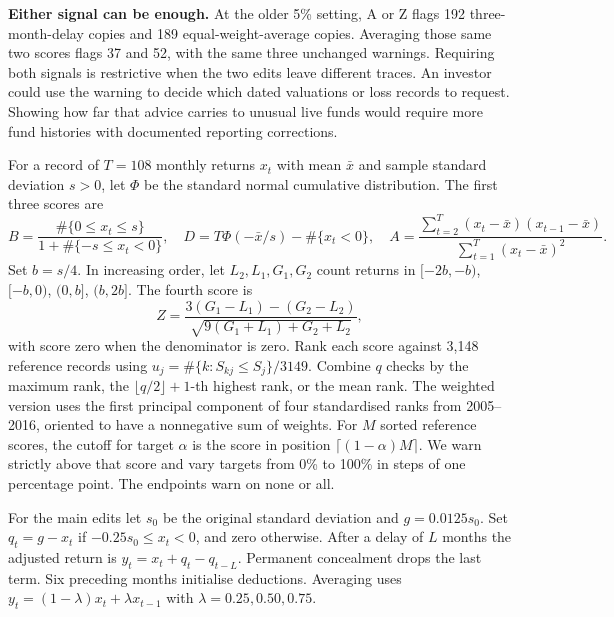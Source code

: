 \documentclass[11pt,letterpaper]{article}
\newcommand{\subhead}[1]{\vspace{3pt}{\large\bfseries #1}\par}
\begin{document}
\textbf{Either signal can be enough.} At the older 5\% setting, A or Z flags 192 three-month-delay copies and 189 equal-weight-average copies. Averaging those same two scores flags 37 and 52, with the same three unchanged warnings. Requiring both signals is restrictive when the two edits leave different traces. An investor could use the warning to decide which dated valuations or loss records to request. Showing how far that advice carries to unusual live funds would require more fund histories with documented reporting corrections.

\subhead{Exact calculations}
For a record of $T=108$ monthly returns $x_t$ with mean $\bar x$ and sample standard deviation $s>0$, let $\Phi$ be the standard normal cumulative distribution. The first three scores are
\[
 B=\frac{\#\{0\leq x_t\leq s\}}{1+\#\{-s\leq x_t<0\}},\quad
 D=T\Phi(-\bar x/s)-\#\{x_t<0\},\quad
 A=\frac{\sum_{t=2}^T(x_t-\bar x)(x_{t-1}-\bar x)}{\sum_{t=1}^T(x_t-\bar x)^2}.
\]
Set $b=s/4$. In increasing order, let $L_2,L_1,G_1,G_2$ count returns in $[-2b,-b)$, $[-b,0)$, $(0,b]$, $(b,2b]$. The fourth score is
\[
 Z=\frac{3(G_1-L_1)-(G_2-L_2)}{\sqrt{9(G_1+L_1)+G_2+L_2}},
\]
with score zero when the denominator is zero. Rank each score against 3,148 reference records using $u_j=\#\{k:S_{kj}\leq S_j\}/3149$. Combine $q$ checks by the maximum rank, the $\lfloor q/2\rfloor+1$-th highest rank, or the mean rank. The weighted version uses the first principal component of four standardised ranks from 2005--2016, oriented to have a nonnegative sum of weights. For $M$ sorted reference scores, the cutoff for target $\alpha$ is the score in position $\lceil(1-\alpha)M\rceil$. We warn strictly above that score and vary targets from 0\% to 100\% in steps of one percentage point. The endpoints warn on none or all.

For the main edits let $s_0$ be the original standard deviation and $g=0.0125s_0$. Set $q_t=g-x_t$ if $-0.25s_0\leq x_t<0$, and zero otherwise. After a delay of $L$ months the adjusted return is $y_t=x_t+q_t-q_{t-L}$. Permanent concealment drops the last term. Six preceding months initialise deductions. Averaging uses $y_t=(1-\lambda)x_t+\lambda x_{t-1}$ with $\lambda=0.25,0.50,0.75$.
\end{document}

